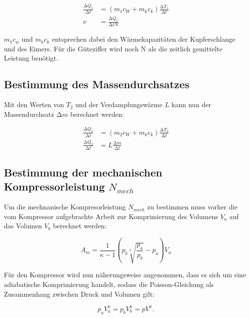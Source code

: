 \begin{align}
  \label{eqn:Gueteziffer}
  \frac{\increment Q_1}{\increment t} &= (m_1c_W + m_kc_k) \frac{\increment T_1}{\increment t} \\
  \nu                                 &= \frac{\increment Q_1}{\increment t N}
\end{align}

$m_1c_w$ und $m_kc_k$ entsprechen dabei den Wärmekapazitäten der Kupferschlange und des Eimers.
Für die Güteziffer wird noch N als die zeitlich gemittelte Leistung benötigt.

\subsection{Bestimmung des Massendurchsatzes}

Mit den Werten von $T_2$ und der Verdampfungswärme $L$ kann nun der Massendurchsatz $\increment m $
berechnet werden:

\begin{align}
  \label{eqn:Massendurchsatz}
  \frac{\increment Q_2}{\increment t} &= (m_2 c_W + m_k c_k) \frac{\increment T_2}{\increment t} \\
  \frac{\increment Q_2}{\increment t} &= L \frac{\increment m}{\increment t}
\end{align}

\subsection{Bestimmung der mechanischen Kompressorleistung \texorpdfstring{$N_{mech}$}{t} }

Um die mechnanische Kompresorleistung $N_{mech}$ zu bestimmen muss vorher die vom Kompressor aufgebrachte
Arbeit zur Komprimierung des Volumens $V_a$ auf das Volumen $V_b$ berechnet werden:

\begin{equation}
  \label{eqn:Am}
  A_m = \frac{1}{\kappa - 1} \left( p_b \sqrt[\kappa]{\frac{p_a}{p_b}} - p_a \right) V_a
\end{equation}

Für den Kompressor wird nun näherungsweise angenommen, dass es sich um eine adiabatische Komprimierung handelt,
sodass die Poisson-Gleichung als Zusammenhang zwischen Druck und Volumen gilt:

\begin{equation}
  p_a V^{\kappa}_a = p_b V^{\kappa}_b = p V^{\kappa} .
\end{equation}

